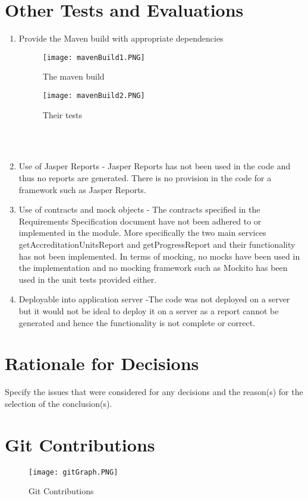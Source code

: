 \section{Other Tests and Evaluations}
 
\begin{enumerate}    
\item Provide the Maven build with appropriate dependencies
\begin{figure}[h!]
  \caption{The maven build}
	\texttt{[image: mavenBuild1.PNG]}
\end{figure} 
\begin{figure}[h!]
  \caption{Their tests}
	\texttt{[image: mavenBuild2.PNG]}
\end{figure} \\ \\
\item Use of Jasper Reports - Jasper Reports has not been used in the code and thus no reports are generated. There is no provision in the code for a framework such as Jasper Reports. 
\item Use of contracts and mock objects - The contracts specified in the Requirements Specification document have not been adhered to or implemented in the module. More specifically the two main services getAccreditationUnitsReport and getProgressReport and their functionality has not been implemented. In terms of mocking, no mocks have been used in the implementation and no mocking framework such as Mockito has been used in the unit tests provided either.
\item Deployable into application server -The code was not deployed on a server but it would not be ideal to deploy it on a server as a report cannot be generated and hence the functionality is not complete or correct.  
\end{enumerate}

\section{Rationale for Decisions}
Specify the issues that were considered for any decisions and the reason(s) for the selection of the
conclusion(s).

\section{Git Contributions}
\begin{figure}[h!]
  \caption{Git Contributions}
	\texttt{[image: gitGraph.PNG]}
\end{figure} 


